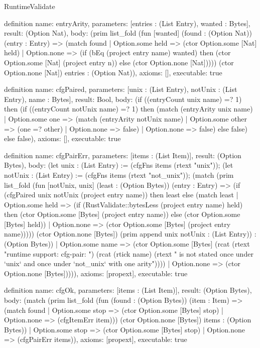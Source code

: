 \begin{lexlean}{RuntimeValidate}
\begin{semanticmodule}
definition{
  name: entryArity,
  parameters: [entries : (List Entry), wanted : Bytes],
  result: (Option Nat),
  body: (prim list_fold (fun [wanted] (found : (Option Nat)) (entry : Entry) => (match found
    | Option.some held => (ctor Option.some [Nat] held)
    | Option.none => (if (bEq (project entry name) wanted) then (ctor Option.some [Nat] (project entry n)) else (ctor Option.none [Nat])))) (ctor Option.none [Nat]) entries : (Option Nat)),
  axioms: [],
  executable: true
}

definition{
  name: cfgPaired,
  parameters: [unix : (List Entry), notUnix : (List Entry), name : Bytes],
  result: Bool,
  body: (if ((entryCount unix name) =? 1) then (if ((entryCount notUnix name) =? 1) then (match (entryArity unix name)
    | Option.some one => (match (entryArity notUnix name)
      | Option.some other => (one =? other)
      | Option.none => false)
    | Option.none => false) else false) else false),
  axioms: [],
  executable: true
}

definition{
  name: cfgPairErr,
  parameters: [items : (List Item)],
  result: (Option Bytes),
  body: (let unix : (List Entry) := (cfgFns items (rtext "unix")); (let notUnix : (List Entry) := (cfgFns items (rtext "not_unix")); (match (prim list_fold (fun [notUnix, unix] (least : (Option Bytes)) (entry : Entry) => (if (cfgPaired unix notUnix (project entry name)) then least else (match least
      | Option.some held => (if (RustValidate::bytesLess (project entry name) held) then (ctor Option.some [Bytes] (project entry name)) else (ctor Option.some [Bytes] held))
      | Option.none => (ctor Option.some [Bytes] (project entry name))))) (ctor Option.none [Bytes]) (prim append unix notUnix : (List Entry)) : (Option Bytes))
    | Option.some name => (ctor Option.some [Bytes] (rcat (rtext "runtime support: cfg-pair: ") (rcat (rtick name) (rtext " is not stated once under `unix` and once under `not_unix` with one arity"))))
    | Option.none => (ctor Option.none [Bytes])))),
  axioms: [propext],
  executable: true
}

definition{
  name: cfgOk,
  parameters: [items : (List Item)],
  result: (Option Bytes),
  body: (match (prim list_fold (fun (found : (Option Bytes)) (item : Item) => (match found
      | Option.some stop => (ctor Option.some [Bytes] stop)
      | Option.none => (cfgItemErr item))) (ctor Option.none [Bytes]) items : (Option Bytes))
    | Option.some stop => (ctor Option.some [Bytes] stop)
    | Option.none => (cfgPairErr items)),
  axioms: [propext],
  executable: true
}


\end{semanticmodule}
\end{lexlean}
